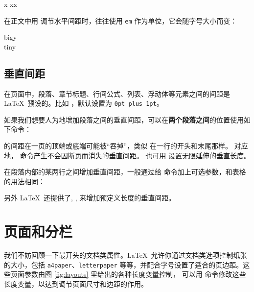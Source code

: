 \begin{example}
x
xx
\end{example}

在正文中用  调节水平间距时，往往使用 \texttt{em} 作为单位，它会随字号大小而变：

\begin{example}
{\Large{}big\hspace{1em}y}\\
{\tiny{}tin\hspace{1em}y}
\end{example}

\subsection{垂直间距}\label{subsec:vspace}

在页面中，段落、章节标题、行间公式、列表、浮动体等元素之间的间距是 \LaTeX\ 预设的。比如  ，默认设置为 \texttt{0pt plus 1pt}。

如果我们想要人为地增加段落之间的垂直间距，可以在\textbf{两个段落之间}的位置使用如下命令：
\begin{command}
\end{command}

 的间距在一页的顶端或底端可能被“吞掉”，类似  在一行的开头和末尾那样。
对应地， 命令产生不会因断页而消失的垂直间距。 也可用  设置无限延伸的垂直长度。

在段落内部的某两行之间增加垂直间距，一般通过给  命令加上可选参数，和表格的用法相同：
\begin{command}
\end{command}

另外 \LaTeX\ 还提供了, ,  来增加预定义长度的垂直间距。

\section{页面和分栏}\label{sec:page-columns}

我们不妨回顾一下最开头的文档类属性。\LaTeX\ 允许你通过文档类选项控制纸张的大小，包括 \texttt{a4paper}、\texttt{letterpaper}
等等，并配合字号设置了适合的页边距。这些页面参数由图 \ref{fig:layouts} 里给出的各种长度变量控制，
可以用  命令修改这些长度变量，以达到调节页面尺寸和边距的作用。

